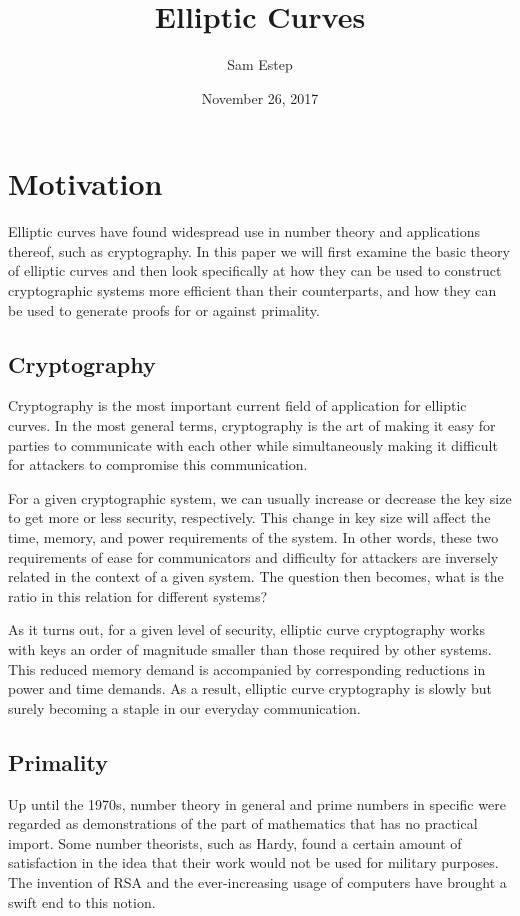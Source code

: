 \documentclass[12pt]{article}
\title{Elliptic Curves}
\author{Sam Estep}
\date{November 26, 2017}
\begin{document}
\maketitle

\section{Motivation}

Elliptic curves have found widespread use in number theory and applications
thereof, such as cryptography. In this paper we will first examine the basic
theory of elliptic curves and then look specifically at how they can be used to
construct cryptographic systems more efficient than their counterparts, and how
they can be used to generate proofs for or against primality.

\subsection{Cryptography}

Cryptography is the most important current field of application for elliptic
curves. In the most general terms, cryptography is the art of making it easy for
parties to communicate with each other while simultaneously making it difficult
for attackers to compromise this communication.

For a given cryptographic system, we can usually increase or decrease the key
size to get more or less security, respectively. This change in key size will
affect the time, memory, and power requirements of the system. In other words,
these two requirements of ease for communicators and difficulty for attackers
are inversely related in the context of a given system. The question then
becomes, what is the ratio in this relation for different systems?

As it turns out, for a given level of security, elliptic curve cryptography
works with keys an order of magnitude smaller than those required by other
systems.\cite{nsa} This reduced memory demand is accompanied by corresponding
reductions in power and time demands. As a result, elliptic curve cryptography
is slowly but surely becoming a staple in our everyday communication.

\subsection{Primality}

Up until the 1970s, number theory in general and prime numbers in specific were
regarded as demonstrations of the part of mathematics that has no practical
import. Some number theorists, such as Hardy, found a certain amount of
satisfaction in the idea that their work would not be used for military
purposes.\cite{hardy} The invention of RSA and the ever-increasing usage of
computers have brought a swift end to this notion.
\end{document}
